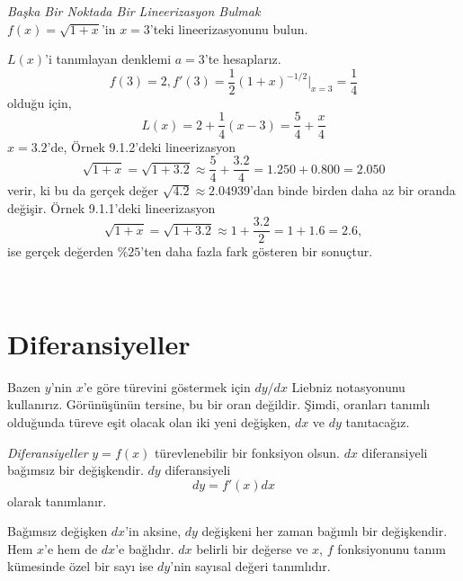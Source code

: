\begin{ornek}\textit{Başka Bir Noktada Bir Lineerizasyon Bulmak}\\
$f(x)=\sqrt{1+x}$'in $x=3$'teki lineerizasyonunu bulun.
\end{ornek}
\begin{cozum}$L(x)$'i tanımlayan denklemi $a=3$'te hesaplarız.
	\begin{equation*}
	f(3)=2, f'(3)=\frac{1}{2}(1+x)^{-1/2}|_{x=3}=\frac{1}{4}
	\end{equation*}
olduğu için,
	\begin{equation*}
	L(x)=2+\frac{1}{4}(x-3)=\frac{5}{4}+\frac{x}{4}
	\end{equation*}
$x=3.2$'de, Örnek 9.1.2'deki lineerizasyon
	\begin{equation*}
	\sqrt{1+x}= \sqrt{1+3.2}\approx \frac{5}{4}+\frac{3.2}{4}=1.250+0.800=2.050
	\end{equation*}
verir, ki bu da gerçek değer $\sqrt{4.2}\approx2.04939$'dan binde birden daha az bir oranda değişir. Örnek 9.1.1'deki lineerizasyon
	\begin{equation*}
	\sqrt{1+x}=\sqrt{1+3.2}\approx1+\frac{3.2}{2}=1+1.6=2.6,
	\end{equation*}
ise gerçek değerden $\% 25$'ten daha fazla fark gösteren bir sonuçtur.
\end{cozum}\\
\section{\protect Diferansiyeller}
Bazen $y$'nin $x$'e göre türevini göstermek için $dy/dx$ Liebniz notasyonunu kullanırız. Görünüşünün tersine, bu bir oran değildir. Şimdi, oranları tanımlı olduğunda türeve eşit olacak olan iki yeni değişken, $dx$ ve $dy$ tanıtacağız.
\begin{tanim}\textit{Diferansiyeller}
	$y=f(x)$ türevlenebilir bir fonksiyon olsun. $dx$ diferansiyeli bağımsız bir değişkendir. $dy$ diferansiyeli
	\begin{equation*}
	dy=f'(x)dx
	\end{equation*}
olarak tanımlanır.
\end{tanim}
Bağımsız değişken $dx$'in aksine, $dy$ değişkeni her zaman bağımlı bir değişkendir. Hem $x$'e hem de $dx$'e bağlıdır. $dx$ belirli bir değerse ve $x$, $f$ fonksiyonunu tanım kümesinde özel bir sayı ise $dy$'nin sayısal değeri tanımlıdır.

